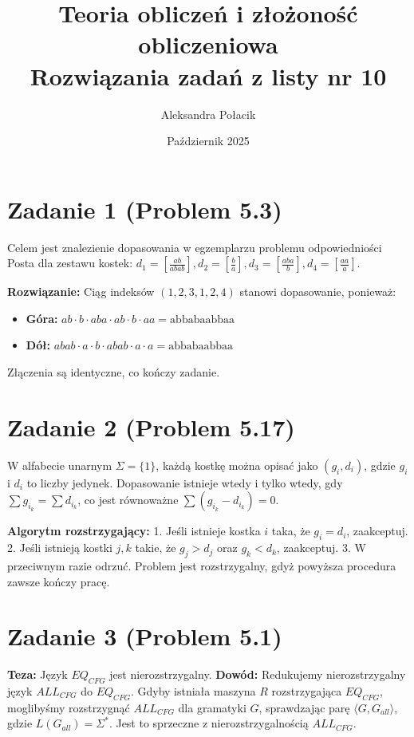 \documentclass{article}
\title{Teoria obliczeń i złożoność obliczeniowa \\ Rozwiązania zadań z listy nr 10}
\author{Aleksandra Połacik}
\date{Październik 2025}
\begin{document}
\maketitle

\section*{Zadanie 1 (Problem 5.3)}
Celem jest znalezienie dopasowania w egzemplarzu problemu odpowiedniości Posta dla zestawu kostek:
$d_1 = [\frac{ab}{abab}], d_2 = [\frac{b}{a}], d_3 = [\frac{aba}{b}], d_4 = [\frac{aa}{a}]$.

\textbf{Rozwiązanie:}
Ciąg indeksów $(1, 2, 3, 1, 2, 4)$ stanowi dopasowanie, ponieważ:
\begin{itemize}
    \item \textbf{Góra:} $ab \cdot b \cdot aba \cdot ab \cdot b \cdot aa = \text{abbabaabbaa}$
    \item \textbf{Dół:} $abab \cdot a \cdot b \cdot abab \cdot a \cdot a = \text{abbabaabbaa}$
\end{itemize}
Złączenia są identyczne, co kończy zadanie.

\section*{Zadanie 2 (Problem 5.17)}
W alfabecie unarnym $\Sigma=\{1\}$, każdą kostkę można opisać jako $(g_i, d_i)$, gdzie $g_i$ i $d_i$ to liczby jedynek.
Dopasowanie istnieje wtedy i tylko wtedy, gdy $\sum g_{i_k} = \sum d_{i_k}$, co jest równoważne $\sum (g_{i_k} - d_{i_k}) = 0$.

\textbf{Algorytm rozstrzygający:}
1. Jeśli istnieje kostka $i$ taka, że $g_i = d_i$, zaakceptuj.
2. Jeśli istnieją kostki $j, k$ takie, że $g_j > d_j$ oraz $g_k < d_k$, zaakceptuj.
3. W przeciwnym razie odrzuć.
Problem jest rozstrzygalny, gdyż powyższa procedura zawsze kończy pracę.

\section*{Zadanie 3 (Problem 5.1)}
\textbf{Teza:} Język $EQ_{CFG}$ jest nierozstrzygalny.
\textbf{Dowód:} Redukujemy nierozstrzygalny język $ALL_{CFG}$ do $EQ_{CFG}$.
Gdyby istniała maszyna $R$ rozstrzygająca $EQ_{CFG}$, moglibyśmy rozstrzygnąć $ALL_{CFG}$ dla gramatyki $G$, sprawdzając parę $\langle G, G_{all} \rangle$, gdzie $L(G_{all}) = \Sigma^*$. Jest to sprzeczne z nierozstrzygalnością $ALL_{CFG}$.
\end{document}
